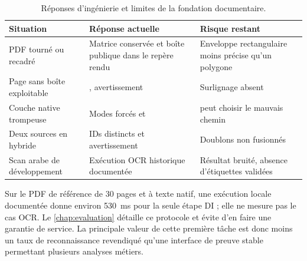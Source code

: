 \begin{table}[H]\centering\tighttable
\begin{tabularx}{\textwidth}{@{}p{28mm}Y Y@{}}\toprule
Situation & Réponse actuelle & Risque restant\\\midrule
PDF tourné ou recadré & Matrice conservée et boîte publique dans le repère rendu & Enveloppe rectangulaire moins précise qu'un polygone\\
Page sans boîte exploitable & \texttt{}, avertissement \texttt{} & Surlignage absent\\
Couche native trompeuse & Modes forcés \texttt{} et \texttt{} & \texttt{} peut choisir le mauvais chemin\\
Deux sources en hybride & IDs distincts et avertissement & Doublons non fusionnés\\
Scan arabe de développement & Exécution OCR historique documentée & Résultat bruité, absence d'étiquettes validées\\\bottomrule
\end{tabularx}
\caption{Réponses d'ingénierie et limites de la fondation documentaire.}\label{tab:di-erreurs}
\end{table}

Sur le PDF de référence de 30 pages et à texte natif, une exécution locale documentée donne environ 530~ms pour la seule étape DI ; elle ne mesure pas le cas OCR. Le \autoref{chap:evaluation} détaille ce protocole et évite d'en faire une garantie de service. La principale valeur de cette première tâche est donc moins un taux de reconnaissance revendiqué qu'une interface de preuve stable permettant plusieurs analyses métiers.
